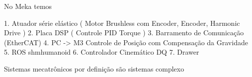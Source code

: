 No Meka temos

1. Atuador série elástico ( Motor Brushless com Encoder, Encoder, Harmonic Drive )
2. Placa DSP ( Controle PID Torque )
3. Barramento de Comunicação (EtherCAT)
4. PC -> M3 Controle de Posição com Compensação da Gravidade
5. ROS shmhumanoid
6. Controlador Cinemático DQ
7. Drawer


Sistemas mecatrônicos por definição são sistemas complexo

